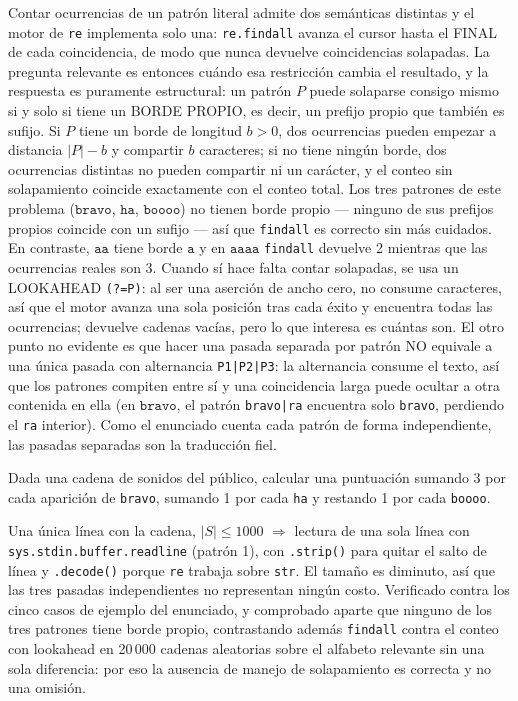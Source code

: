  Contar ocurrencias de un patrón literal admite dos semánticas distintas y el motor de \texttt{re} implementa solo una: \texttt{re.findall} avanza el cursor hasta el FINAL de cada coincidencia, de modo que nunca devuelve coincidencias solapadas. La pregunta relevante es entonces cuándo esa restricción cambia el resultado, y la respuesta es puramente estructural: un patrón $P$ puede solaparse consigo mismo si y solo si tiene un BORDE PROPIO, es decir, un prefijo propio que también es sufijo. Si $P$ tiene un borde de longitud $b > 0$, dos ocurrencias pueden empezar a distancia $|P| - b$ y compartir $b$ caracteres; si no tiene ningún borde, dos ocurrencias distintas no pueden compartir ni un carácter, y el conteo sin solapamiento coincide exactamente con el conteo total. Los tres patrones de este problema ($\texttt{bravo}$, $\texttt{ha}$, $\texttt{boooo}$) no tienen borde propio — ninguno de sus prefijos propios coincide con un sufijo — así que \texttt{findall} es correcto sin más cuidados. En contraste, $\texttt{aa}$ tiene borde $\texttt{a}$ y en $\texttt{aaaa}$ \texttt{findall} devuelve 2 mientras que las ocurrencias reales son 3. Cuando sí hace falta contar solapadas, se usa un LOOKAHEAD \texttt{(?=P)}: al ser una aserción de ancho cero, no consume caracteres, así que el motor avanza una sola posición tras cada éxito y encuentra todas las ocurrencias; devuelve cadenas vacías, pero lo que interesa es cuántas son. El otro punto no evidente es que hacer una pasada separada por patrón NO equivale a una única pasada con alternancia \texttt{P1|P2|P3}: la alternancia consume el texto, así que los patrones compiten entre sí y una coincidencia larga puede ocultar a otra contenida en ella (en $\texttt{bravo}$, el patrón \texttt{bravo|ra} encuentra solo \texttt{bravo}, perdiendo el \texttt{ra} interior). Como el enunciado cuenta cada patrón de forma independiente, las pasadas separadas son la traducción fiel.


Dada una cadena de sonidos del público, calcular una puntuación sumando 3 por cada aparición de \texttt{bravo}, sumando 1 por cada \texttt{ha} y restando 1 por cada \texttt{boooo}.

 Una única línea con la cadena, $|S| \le 1000$ $\Rightarrow$ lectura de una sola línea con \texttt{sys.stdin.buffer.readline} (patrón 1), con \texttt{.strip()} para quitar el salto de línea y \texttt{.decode()} porque \texttt{re} trabaja sobre \texttt{str}. El tamaño es diminuto, así que las tres pasadas independientes no representan ningún costo. Verificado contra los cinco casos de ejemplo del enunciado, y comprobado aparte que ninguno de los tres patrones tiene borde propio, contrastando además \texttt{findall} contra el conteo con lookahead en 20\,000 cadenas aleatorias sobre el alfabeto relevante sin una sola diferencia: por eso la ausencia de manejo de solapamiento es correcta y no una omisión.

